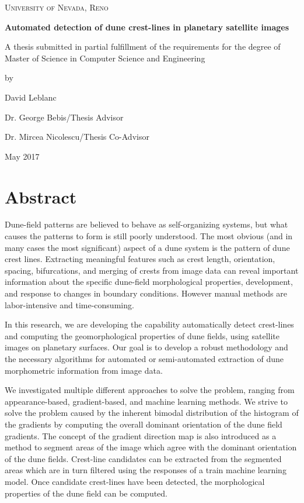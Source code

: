 \documentclass[11pt]{article}
\begin{document}
\begin{titlepage}
	\centering
	{\scshape\LARGE University of Nevada, Reno \par}
	\vspace{2.5cm}
	{\Large\bfseries Automated detection of dune crest-lines in planetary satellite images\par}
	\vspace{2.5cm}
	{\large A thesis submitted in partial fulfillment of the requirements for the degree of Master of Science in Computer Science and Engineering\par}
	\vspace{1.5cm}	
	{\Large by\par}
	{\Large David Leblanc\par}
	\vfill
	{\large Dr. George Bebis/Thesis Advisor
		 
		Dr. Mircea Nicolescu/Thesis Co-Advisor}
	\vfill
	{\large May 2017\par}
\end{titlepage}
\section*{Abstract}

Dune-field patterns are believed to behave as self-organizing systems, but what causes the patterns to form is still poorly understood. The most obvious (and in many cases the most significant) aspect of a dune system is the pattern of dune crest lines. Extracting meaningful features such as crest length, orientation, spacing, bifurcations, and merging of crests from image data can reveal important information about the specific dune-field morphological properties, development, and response to changes in boundary conditions. However manual methods are labor-intensive and time-consuming. 

In this research, we are developing the capability automatically detect crest-lines and computing the geomorphological properties of dune fields, using satellite images on planetary surfaces. Our goal is to develop a robust methodology and the necessary algorithms for automated or semi-automated extraction of dune morphometric information from image data.

We investigated multiple different approaches to solve the problem, ranging from appearance-based, gradient-based, and machine learning methods. We strive to solve the problem caused by the inherent bimodal distribution of the histogram of the gradients by computing the overall dominant orientation of the dune field gradients. The concept of the gradient direction map is also introduced as a method to segment areas of the image which agree with the dominant orientation of the dune fields. Crest-line candidates can be extracted from the segmented areas which are in turn filtered using the responses of a train machine learning model. Once candidate crest-lines have been detected, the morphological properties of the dune field can be computed.
\end{document}
